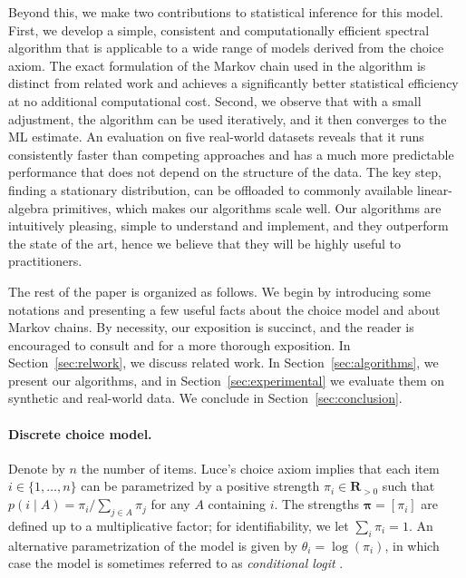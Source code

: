 Beyond this, we make two contributions to statistical inference for this model.
First, we develop a simple, consistent and computationally efficient spectral algorithm that is applicable to a wide range of models derived from the choice axiom.
The exact formulation of the Markov chain used in the algorithm is distinct from related work \citep{negahban2012iterative, azari2013generalized} and achieves a significantly better statistical efficiency at no additional computational cost.
Second, we observe that with a small adjustment, the algorithm can be used iteratively, and it then converges to the ML estimate.
An evaluation on five real-world datasets reveals that it runs consistently faster than competing approaches and has a much more predictable performance that does not depend on the structure of the data.
The key step, finding a stationary distribution, can be offloaded to commonly available linear-algebra primitives, which makes our algorithms  scale well.
Our algorithms are intuitively pleasing, simple to understand and implement, and they outperform the state of the art, hence we believe that they will be highly useful to practitioners.

The rest of the paper is organized as follows.
We begin by introducing some notations and presenting a few useful facts about the choice model and about Markov chains.
By necessity, our exposition is succinct, and the reader is encouraged to consult \citet{luce1959individual} and \citet{levin2008markov} for a more thorough exposition.
In Section~\ref{sec:relwork}, we discuss related work.
In Section~\ref{sec:algorithms}, we present our algorithms, and in Section~\ref{sec:experimental} we evaluate them on synthetic and real-world data.
We conclude in Section~\ref{sec:conclusion}.


\paragraph{Discrete choice model.}
Denote by $n$ the number of items.
Luce's choice axiom implies that each item $i \in \{1, \ldots, n\}$ can be parametrized by a positive strength $\pi_i \in \mathbf{R}_{>0}$ such that $p(i \mid A) = \pi_i / \sum_{j \in A} \pi_j$ for any $A$ containing $i$.
The strengths $\bm{\pi} = [\pi_i]$ are defined up to a multiplicative factor;
for identifiability, we let $\sum_i \pi_i = 1$.
An alternative parametrization of the model is given by $\theta_i = \log(\pi_i)$, in which case the model is sometimes referred to as \emph{conditional logit} \citep{mcfadden1973conditional}.

